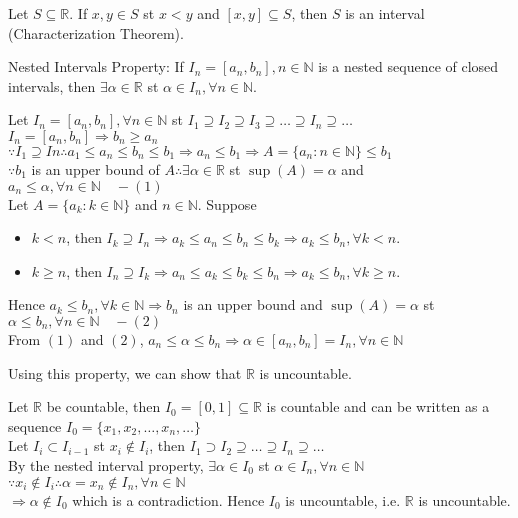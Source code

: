 \documentclass{article}
\begin{document}
Let $S \subseteq \mathbb{R}$. If $x,y \in S$ st $x < y$ and $[x,y] \subseteq S$, then $S$ is an interval (Characterization Theorem).

Nested Intervals Property: If $I_n = [a_n,b_n], n \in \mathbb{N}$ is a nested sequence of closed intervals, then $\exists \alpha \in \mathbb{R}$ st $\alpha \in I_n, \forall n \in \mathbb{N}$.
\begin{tcolorbox}[colback=lightgray!10,colframe=lightgray!10, fontupper=\linespread{1.5}\selectfont]
	Let $I_n = [a_n, b_n], \forall n \in \mathbb{N}$ st $I_1 \supseteq I_2 \supseteq I_3 \supseteq \dots \supseteq I_n \supseteq \dots$ \\
	$I_n = [a_n, b_n] \Rightarrow b_n \geq a_n$\\
	$\because I_1 \supseteq In \therefore a_1 \leq a_n \leq b_n \leq b_1 \Rightarrow a_n \leq b_1 \Rightarrow A = \{a_n : n \in \mathbb{N}\} \leq b_1$\\
	$\because b_1$ is an upper bound of $A \therefore \exists \alpha \in \mathbb{R}$ st $\sup(A) = \alpha$ and $a_n \leq \alpha, \forall n \in \mathbb{N} \quad - (1)$ \\
	Let $A = \{a_k: k \in \mathbb{N}\}$ and $n \in \mathbb{N}$. Suppose
	\begin{itemize}
		\item $k < n$, then $I_k \supseteq I_n \Rightarrow a_k \leq a_n \leq b_n \leq b_k \Rightarrow a_k \leq b_n, \forall k < n$.
		\item $k \geq n$, then $I_n \supseteq I_k \Rightarrow a_n \leq a_k \leq b_k \leq b_n \Rightarrow a_k \leq b_n, \forall k \geq n$.
	\end{itemize}
	Hence $a_k \leq b_n, \forall k \in \mathbb{N} \Rightarrow b_n$ is an upper bound and $\sup(A) = \alpha$ st $\alpha \leq b_n, \forall n \in \mathbb{N} \quad - (2)$ \\
	From $(1)$ and $(2)$, $a_n \leq \alpha \leq b_n \Rightarrow \alpha \in [a_n,b_n] = I_n, \forall n \in \mathbb{N}$
\end{tcolorbox}

Using this property, we can show that $\mathbb{R}$ is uncountable.
\begin{tcolorbox}[colback=lightgray!10,colframe=lightgray!10, fontupper=\linespread{1.5}\selectfont]
	Let $\mathbb{R}$ be countable, then $I_0 = [0,1] \subseteq \mathbb{R}$ is countable and can be written as a sequence $I_0 = \{x_1, x_2, \dots, x_n, \dots\}$ \\
	Let $I_i \subset I_{i-1}$ st $x_i \not\in I_i$, then $I_1 \supset I_2 \supseteq \dots \supseteq I_n \supseteq \dots$\\
	By the nested interval property, $\exists \alpha \in I_0$ st $\alpha \in I_n, \forall n \in \mathbb{N}$\\
	$\because x_i \not\in I_i \therefore \alpha = x_n \not\in I_n, \forall n \in \mathbb{N}$\\
	$\Rightarrow \alpha \not\in I_0$ which is a contradiction. Hence $I_0$ is uncountable, i.e. $\mathbb{R}$ is uncountable.
\end{tcolorbox}
\end{document}
